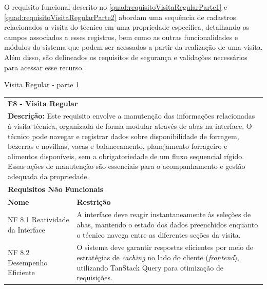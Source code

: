 \clearpage

O requisito funcional descrito no \autoref{quad:requisitoVisitaRegularParte1} e \autoref{quad:requisitoVisitaRegularParte2} abordam uma sequência de cadastros relacionados a visita do técnico em uma propriedade específica, detalhando os campos associados a esses registros, bem como as outras funcionalidades e módulos do sistema que podem ser acessados a partir da realização de uma visita. Além disso, são delineados os requisitos de segurança e validações necessários para acessar esse recurso.

\begin{tabframed}[htb]
  \caption{Visita Regular - parte 1}
  \label{quad:requisitoVisitaRegularParte1}
  \renewcommand{\arraystretch}{1.5}
  \begin{tabular}{|l|l|}
    \cline{1-2}
    \multicolumn{2}{|l|}{\textbf{F8 - Visita Regular}}
    \\ \cline{1-2}

    \multicolumn{2}{|p{15cm}|}{
    \raggedright \textbf{Descrição:} Este requisito envolve a manutenção das informações relacionadas à visita técnica, organizada de forma modular através de abas na interface. O técnico pode navegar e registrar dados sobre disponibilidade de forragem, bezerras e novilhas, vacas e balanceamento, planejamento forrageiro e alimentos disponíveis, sem a obrigatoriedade de um fluxo sequencial rígido. Essas ações de manutenção são essenciais para o acompanhamento e gestão adequada da propriedade.
    }
    \\ \cline{1-2}

    \multicolumn{2}{|l|}{\textbf{Requisitos Não Funcionais}}
    \\ \cline{1-2}

    \textbf{Nome}                                                                 &
    \textbf{Restrição}
    \\ \cline{1-2}

    \multicolumn{1}{|p{3cm}|}{\raggedright NF 8.1 Reatividade da Interface}           &
    \multicolumn{1}{|p{12cm}|}{\raggedright A interface deve reagir instantaneamente às seleções de abas, mantendo o estado dos dados preenchidos enquanto o técnico navega entre as diferentes seções da visita.}
    \\ \cline{1-2}

    \multicolumn{1}{|p{3cm}|}{\raggedright NF 8.2 Desempenho Eficiente}          &
    \multicolumn{1}{|p{12cm}|}{\raggedright O sistema deve garantir respostas eficientes por meio de estratégias de \textit{caching} no lado do cliente (\textit{frontend}), utilizando TanStack Query para otimização de requisições.}
    \\ \cline{1-2}


\end{tabular}
\end{tabframed}
